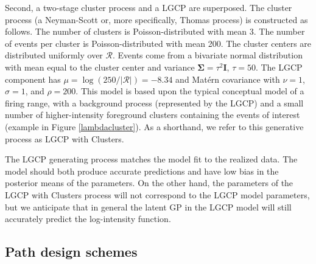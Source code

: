 \documentclass[review]{elsarticle}
\begin{document}
Second, a two-stage cluster process and a LGCP are superposed. The cluster
process (a Neyman-Scott or, more specifically, Thomas process) is constructed
as follows. The number of clusters is Poisson-distributed with mean 3. The
number of events per cluster is Poisson-distributed with mean 200. The cluster
centers are distributed uniformly over \(\mathcal{R}\). Events come from a
bivariate normal distribution with mean equal to the cluster center and
variance \(\boldsymbol{\Sigma} = \tau^{2}\mathbf{I}\), \(\tau = 50\). The LGCP
component has \(\mu = \log(250 / |\mathcal{R}|) = -8.34\) and Mat\'{e}rn
covariance with \(\nu = 1\), \(\sigma = 1\), and \(\rho = 200\). This model is
based upon the typical conceptual model of a firing range, with a background
process (represented by the LGCP) and a small number of higher-intensity
foreground clusters containing the events of interest (example in Figure
\ref{lambdacluster}). As a shorthand, we refer to this generative process as
LGCP with Clusters.

The LGCP generating process matches the model fit to the realized data. The
model should both produce accurate predictions and have low bias in the
posterior means of the parameters. On the other hand, the parameters of the
LGCP with Clusters process will not correspond to the LGCP model parameters,
but we anticipate that in general the latent GP in the LGCP model will still
accurately predict the log-intensity function.


\subsection{Path design schemes}
\label{simschemes}
\end{document}
